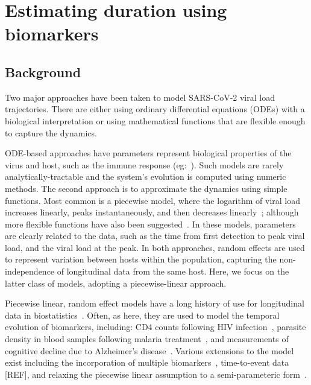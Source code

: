 \documentclass[thesis.tex]{subfiles}
\begin{document}
\ifSubfilesClassLoaded{
  \setcounter{chapter}{4}
}

\chapter{Estimating duration using biomarkers} \label{ATACCC}

\section{Background}

Two major approaches have been taken to model SARS-CoV-2 viral load trajectories.
There are either using ordinary differential equations (ODEs) with a biological interpretation or using mathematical functions that are flexible enough to capture the dynamics.

ODE-based approaches have parameters represent biological properties of the virus and host, such as the immune response (eg:~\autocites{ejimaEstimation,keViro,kimQuantitative,goncalvesTiming,perelsonMechanistic}).
Such models are rarely analytically-tractable and the system's evolution is computed using numeric methods.
The second approach is to approximate the dynamics using simple functions.
Most common is a piecewise model, where the logarithm of viral load increases linearly, peaks instantaneously, and then decreases linearly~\autocites{clearyUsing,kisslerSARSCoV2,larremoreTest}; although more flexible functions have also been suggested~\autocites{quiltyQuarantine}.
In these models, parameters are clearly related to the data, such as the time from first detection to peak viral load, and the viral load at the peak.
In both approaches, random effects are used to represent variation between hosts within the population, capturing the non-independence of longitudinal data from the same host.
Here, we focus on the latter class of models, adopting a piecewise-linear approach.

Piecewise linear, random effect models have a long history of use for longitudinal data in biostatistics~\autocites{slateStatistical}.
Often, as here, they are used to model the temporal evolution of biomarkers, including:
CD4 counts following HIV infection~\autocites{langeHierarchical,lynchPredicting}, parasite density in
blood samples following malaria treatment~\autocites{fogartyBayesian}, and measurements
of cognitive decline due to Alzheimer's disease~\autocites{bealisleBayesian}.
Various extensions to the model exist including the incorporation of multiple biomarkers~\autocites{inoueModeling,giardinaGetting}, time-to-event data [REF], and relaxing the piecewise linear assumption to a semi-parameteric form~\autocites{zegerSemiparametric}.
\end{document}
